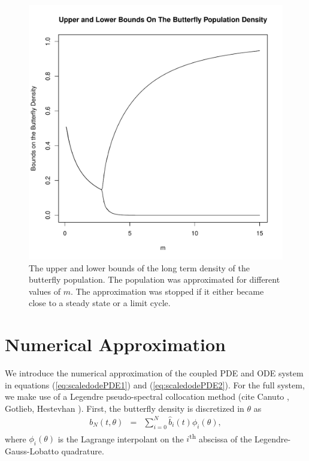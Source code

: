 \documentclass[12pt]{article}
\begin{document}
\begin{figure}[htb]
  \centering
  \includegraphics[width=12cm]{ODEButterflyBounds.pdf}
  \caption[Upper and lower bounds of the butterfly density.]{The upper
    and lower bounds of the long term density of the butterfly
    population. The population was approximated for different values
    of $m$. The approximation was stopped if it either became close to
    a steady state or a limit cycle.}
  \label{fig:odeButterflyBifurcation}
\end{figure}

\section{Numerical Approximation}

We introduce the numerical approximation of the coupled PDE and ODE
system in equations (\ref{eq:scaledodePDE1}) and
(\ref{eq:scaledodePDE2}). For the full system, we make use of a
Legendre pseudo-spectral collocation method (cite Canuto , Gotlieb,
Hestevhan ). First, the butterfly density is discretized in $\theta$
as
\begin{eqnarray}
  \label{eqn:spatialDiscretization}
  b_N(t,\theta) & = & \sum^N_{i=0} \hat{b}_i(t) \phi_i(\theta),
\end{eqnarray}
where $\phi_i(\theta)$ is the Lagrange interpolant on the
$i$\textsuperscript{th} abscissa of the Legendre-Gauss-Lobatto
quadrature.
\end{document}
